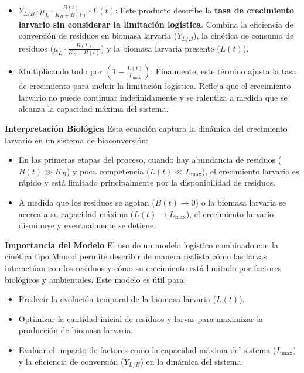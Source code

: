 \documentclass[12pt]{article}
\begin{document}
\begin{itemize}
    \item $Y_{L/B} \cdot \mu_L \cdot \frac{B(t)}{K_B + B(t)} \cdot L(t)$: Este producto describe la \textbf{tasa de crecimiento larvario sin considerar la limitación logística}. Combina la eficiencia de conversión de residuos en biomasa larvaria ($Y_{L/B}$), la cinética de consumo de residuos ($\mu_L \cdot \frac{B(t)}{K_B + B(t)}$) y la biomasa larvaria presente ($L(t)$).

    \item Multiplicando todo por $\left(1 - \frac{L(t)}{L_{\text{max}}}\right)$: Finalmente, este término ajusta la tasa de crecimiento para incluir la limitación logística. Refleja que el crecimiento larvario no puede continuar indefinidamente y se ralentiza a medida que se alcanza la capacidad máxima del sistema.
\end{itemize}

\textbf{Interpretación Biológica}
Esta ecuación captura la dinámica del crecimiento larvario en un sistema de bioconversión:
\begin{itemize}
    \item En las primeras etapas del proceso, cuando hay abundancia de residuos ($B(t) \gg K_B$) y poca competencia ($L(t) \ll L_{\text{max}}$), el crecimiento larvario es rápido y está limitado principalmente por la disponibilidad de residuos.
    \item A medida que los residuos se agotan ($B(t) \to 0$) o la biomasa larvaria se acerca a su capacidad máxima ($L(t) \to L_{\text{max}}$), el crecimiento larvario disminuye y eventualmente se detiene.
\end{itemize}

\textbf{Importancia del Modelo}
El uso de un modelo logístico combinado con la cinética tipo Monod permite describir de manera realista cómo las larvas interactúan con los residuos y cómo su crecimiento está limitado por factores biológicos y ambientales. Este modelo es útil para:
\begin{itemize}
    \item Predecir la evolución temporal de la biomasa larvaria ($L(t)$).
    \item Optimizar la cantidad inicial de residuos y larvas para maximizar la producción de biomasa larvaria.
    \item Evaluar el impacto de factores como la capacidad máxima del sistema ($L_{\text{max}}$) y la eficiencia de conversión ($Y_{L/B}$) en la dinámica del sistema.
\end{itemize}
\end{document}
